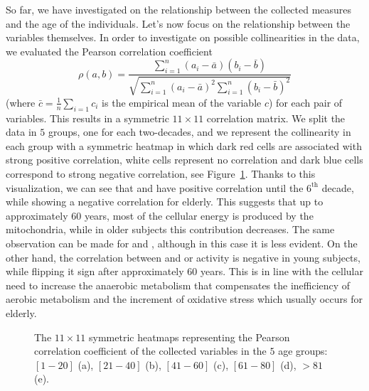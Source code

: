 So far, we have investigated on the relationship between the collected measures and the age of the individuals. Let's now focus on the relationship between the variables themselves. In order to investigate on possible collinearities in the data, we evaluated the Pearson correlation coefficient
\begin{equation}
	\rho(a, b) = \frac{\sum_{i=1}^n (a_i - \bar a)(b_i - \bar b)}{\sqrt{\sum_{i=1}^n(a_i-\bar a)^2 \sum_{i=1}^n(b_i-\bar b)^2}}
\end{equation}
(where $\bar c = \frac{1}{n}\sum_{i=1} c_i$ is the empirical mean of the variable $c$) for each pair of variables. This results in a symmetric $11 \times 11$ correlation matrix.
We split the data in $5$ groups, one for each two-decades, and we represent the collinearity in each group with a symmetric heatmap in which dark red cells are associated with strong positive correlation, white cells represent no correlation and dark blue cells correspond to strong negative correlation, see Figure~\ref{fig:heatmaps}.
Thanks to this visualization, we can see that \atpamp and \popyrmal have positive correlation until the $6^{\text{th}}$ decade, while showing a negative correlation for elderly.
This suggests that up to approximately $60$ years, most of the cellular energy is produced by the mitochondria, while in older subjects this contribution decreases. The same observation can be made for \atpamp and \posucc, although in this case it is less evident. On the other hand, the correlation between \atpamp and \mda or \ldh activity is negative in young subjects, while flipping it sign after approximately $60$ years.
This is in line with the cellular need to increase the anaerobic metabolism that compensates the inefficiency of aerobic metabolism and the increment of oxidative stress which usually occurs for elderly.

\begin{figure}[]
	\centering
		\hfill%
   \hfill
	\caption{The $11 \times 11$ symmetric heatmaps representing the Pearson correlation coefficient of the collected variables in the $5$ age groups: $[1-20]$ (a), $[21-40]$ (b), $[41-60]$ (c), $[61-80]$ (d), $>81$ (e).} \label{fig:heatmaps}
\end{figure}



